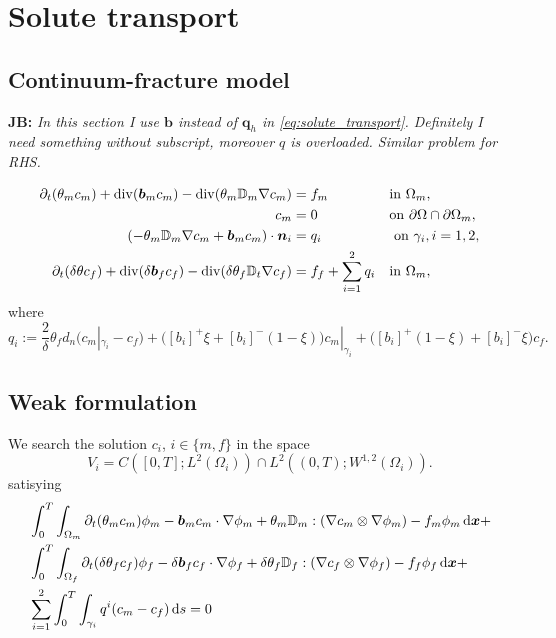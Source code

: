 \documentclass[a4paper]{article}
\def\prtl{\partial}
\def\vc#1{\mathbf{\boldsymbol{#1}}}     %
\def\tn#1{{\mathbb{#1}}}    %
\def\div{{\rm div}}
\def\grad{\nabla}
\def\d {\,{\rm d}}
\newcommand{\note}[2]{{\color{blue} \textbf{ #1:} \textit{#2}}}
\begin{document}
\section{Solute transport}
\subsection{Continuum-fracture model}
\note{JB}{In this section I use $\vc b$ instead of $\vc q_h$ in \eqref{eq:solute_transport}. Definitely I need something without subscript, moreover $q$ is overloaded.
Similar problem for RHS.}

\begin{align}
  \label{eq:fr:solute}
  \prtl_t (\theta_m c_m) + \div(\vc b_m c_m) - \div(\theta_m \tn D_m \grad c_m) &= f_m&&  \text{in } \Omega_m,\\
  \label{eq:fr:Dirichlet}
  c_m &= 0&& \text{on } \partial\Omega\cap\partial\Omega_m,\\
  (- \theta_m \tn D_m\grad c_m + \vc b_m c_m) \cdot \vc n_i &= q_i &&\mbox{ on }\gamma_i,i=1,2,\\ 
  \prtl_t(\delta\theta c_f)  + \div(\delta \vc b_f c_f ) - \div( \delta \theta_f \tn D_t \grad c_f) 
      &= f_f + \sum_{i=1}^2 q_i&&  \text{in } \Omega_m,\\
\end{align}
where 
\[
    q_i:=\frac2\delta \theta_f d_n(c_m|_{\gamma_i} - c_f) 
    +  \big([b_i]^{+}\xi + [b_i]^{-}(1-\xi)\big) c_m|_{\gamma_i}
    +  \big([b_i]^{+}(1-\xi) + [b_i]^{-}\xi\big) c_f.
\]

\subsection{Weak formulation}
We search the solution $c_i$, $i\in \{m,f\}$ in the space 
\[
    V_i =C([0,T]; L^2(\Omega_i) ) \cap L^2( (0,T); W^{1,2}(\Omega_i) ).
\]    
satisying 
\begin{align}
\notag
&\int_0^T \int_{\Omega_m} \prtl_t(\theta_m c_m)\phi_m - \vc b_m c_m \cdot \grad \phi_m + \theta_m \tn D_m : (\grad c_m \otimes \grad \phi_m) - f_m\phi_m \d \vc x+\\
\label{eq:fr:solute_weak}
&\int_0^T \int_{\Omega_f} \prtl_t(\delta\theta_f c_f)\phi_f - \delta \vc b_f c_f \cdot \grad \phi_f + \delta \theta_f \tn D_f : (\grad c_f \otimes \grad \phi_f) - f_f\phi_f \d \vc x+\\
\notag
&\sum_{i=1}^{2} \int_0^T \int_{\gamma_i} q^i (c_m - c_f) \d s = 0
\end{align}
\end{document}
